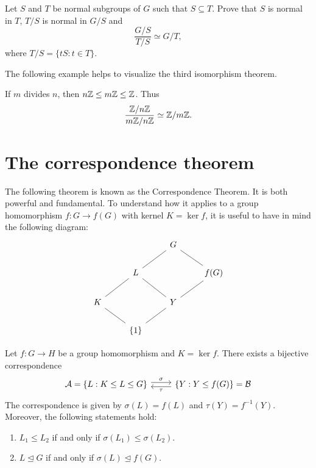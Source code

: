 \begin{bonus}
\label{xca:third}
Let $S$ and $T$ be normal subgroups of $G$ such that 
$S\subseteq T$. Prove that $S$ is normal in $T$, 
$T/S$ is normal in $G/S$ and 
\[
\frac{G/S}{T/S}\simeq G/T,
\]
where $T/S=\{tS:t\in T\}$.
\end{bonus}

The following example helps to visualize the third isomorphism
theorem. 

\begin{example}
If $m$ divides $n$, then $n\mathbb{Z}\leq m\mathbb{Z}\leq\mathbb{Z}$. Thus 
\[
\frac{\mathbb{Z}/n\mathbb{Z}}{m\mathbb{Z}/n\mathbb{Z}}\simeq\mathbb{Z}/m\mathbb{Z}.
\]
\end{example}

\section{The correspondence theorem} 

The following theorem is known as the Correspondence Theorem.
It is both powerful and fundamental. To understand how it applies 
to a group homomorphism
$f\colon G\to f(G)$ with kernel $K=\ker f$, it is useful 
to have in mind the following diagram: 
\[
\begin{tikzcd}
        && G \\
        & L && {f(G)} \\
        K && Y \\
        & {\{1\}}
        \arrow[no head, from=1-3, to=2-4]
        \arrow[no head, from=1-3, to=2-2]
        \arrow[no head, from=2-2, to=3-1]
        \arrow[no head, from=3-1, to=4-2]
        \arrow[no head, from=2-2, to=3-3]
        \arrow[no head, from=3-3, to=4-2]
        \arrow[no head, from=2-4, to=3-3]
\end{tikzcd}
\]

\begin{theorem}
Let $f\colon G\to H$ be a group homomorphism and $K=\ker f$. There exists
a bijective correspondence 
\[\begin{tikzcd}
        {\mathcal{A}=\{L:K\leq L\leq G\}} & {\{Y:Y\leq f(G)\}=\mathcal{B}}
        \arrow["\sigma", shift left=1, from=1-1, to=1-2]
        \arrow["\tau", shift left=1, from=1-2, to=1-1]
\end{tikzcd}
\]
The correspondence is given by $\sigma(L)=f(L)$ and $\tau(Y)=f^{-1}(Y)$. Moreover, the following statements hold: 
\begin{enumerate}
\item $L_1\leq L_2$ if and only if $\sigma(L_1)\leq \sigma(L_2)$.
\item $L\unlhd G$ if and only if $\sigma(L)\unlhd f(G)$.
\end{enumerate}
\end{theorem}


